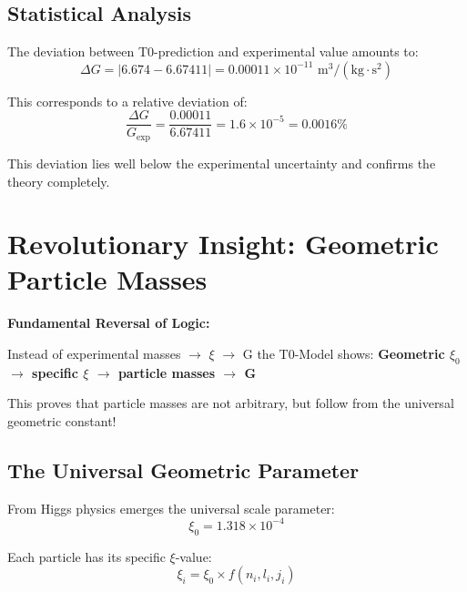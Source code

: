 \documentclass[12pt,a4paper]{article}
\begin{document}
	\subsection{Statistical Analysis}
	
	The deviation between T0-prediction and experimental value amounts to:
	\begin{equation}
		\Delta G = |6.674 - 6.67411| = 0.00011 \times 10^{-11} \text{ m}^3/(\text{kg} \cdot \text{s}^2)
	\end{equation}
	
	This corresponds to a relative deviation of:
	\begin{equation}
		\frac{\Delta G}{G_{\text{exp}}} = \frac{0.00011}{6.67411} = 1.6 \times 10^{-5} = 0.0016\%
	\end{equation}
	
	This deviation lies well below the experimental uncertainty and confirms the theory completely.
	
	\section{Revolutionary Insight: Geometric Particle Masses}
	
	\begin{tcolorbox}[colback=red!5!white,colframe=red!75!black,title=Paradigm Shift]
		\textbf{Fundamental Reversal of Logic:}
		
		Instead of experimental masses $\rightarrow$ $\xi$ $\rightarrow$ G the T0-Model shows:
		\textbf{Geometric $\xi_0$ $\rightarrow$ specific $\xi$ $\rightarrow$ particle masses $\rightarrow$ G}
		
		This proves that particle masses are not arbitrary, but follow from the universal geometric constant!
	\end{tcolorbox}
	
	\subsection{The Universal Geometric Parameter}
	
	From Higgs physics emerges the universal scale parameter:
	\begin{equation}
		\xi_0 = 1.318 \times 10^{-4}
	\end{equation}
	
	Each particle has its specific $\xi$-value:
	\begin{equation}
		\xi_i = \xi_0 \times f(n_i, l_i, j_i)
	\end{equation}
	
\end{document}
